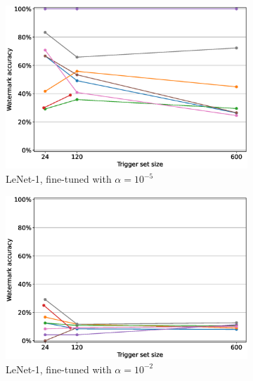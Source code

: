 \begin{figure}
\begin{subfigure}{0.41\linewidth}
        \includegraphics[width=\linewidth]{images/finetuning/lenet1_finetuning_per_arch_1e-05.eps}
        \caption{LeNet-1, fine-tuned with $\alpha=10^{-5}$}
        \label{fig:finetuning-smalllr-allmethods-perarch-lenet1}
    \end{subfigure}
    \quad
    \begin{subfigure}{0.41\linewidth}
        \includegraphics[width=\linewidth]{images/finetuning/lenet1_finetuning_per_arch_001.eps}
        \caption{LeNet-1, fine-tuned with $\alpha=10^{-2}$}
        \label{fig:finetuning-largelr-allmethods-perarch-lenet1}
    \end{subfigure}
    \quad
    \begin{subfigure}{0.41\linewidth}

\end{subfigure}
\end{figure}
